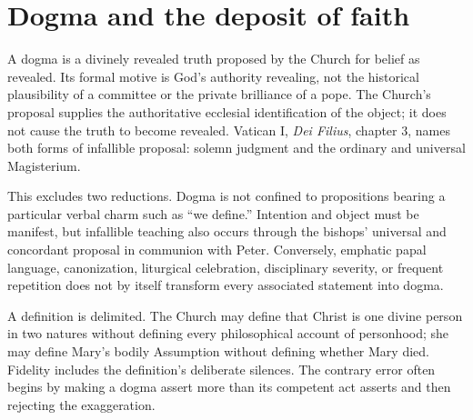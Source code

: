 \section{Dogma and the deposit of faith}

A dogma is a divinely revealed truth proposed by the Church for belief as
revealed. Its formal motive is God's authority revealing, not the historical
plausibility of a committee or the private brilliance of a pope. The Church's
proposal supplies the authoritative ecclesial identification of the object;
it does not cause the truth to become revealed. Vatican I, \emph{Dei Filius},
chapter 3, names both forms of infallible proposal: solemn judgment and the
ordinary and universal Magisterium.

This excludes two reductions. Dogma is not confined to propositions bearing a
particular verbal charm such as ``we define.'' Intention and object must be
manifest, but infallible teaching also occurs through the bishops' universal
and concordant proposal in communion with Peter. Conversely, emphatic papal
language, canonization, liturgical celebration, disciplinary severity, or
frequent repetition does not by itself transform every associated statement
into dogma.

A definition is delimited. The Church may define that Christ is one divine
person in two natures without defining every philosophical account of
personhood; she may define Mary's bodily Assumption without defining whether
Mary died. Fidelity includes the definition's deliberate silences. The
contrary error often begins by making a dogma assert more than its competent
act asserts and then rejecting the exaggeration.

